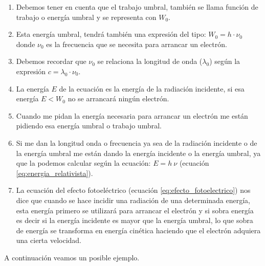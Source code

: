 \begin{consejo}
    \phantom{a}

    \begin{enumerate}
        \item Debemos tener en cuenta que el trabajo umbral, también se llama función de trabajo o energía umbral y se representa con \(W_0\).
        \item Esta energía umbral, tendrá también una expresión del tipo: \(W_0 = h\cdot \nu_0\) donde \(\nu_0\) es la frecuencia que se necesita para arrancar un electrón.
        \item Debemos recordar que \(\nu_0\) se relaciona la longitud de onda (\(\lambda_0\)) según la expresión \(c = \lambda_0 \cdot \nu_0\).
        \item La energía \(E\) de la ecuación es la energía de la radiación incidente, si esa energía \(E < W_0 \) no se arrancará ningún electrón.
        \item Cuando me pidan la energía necesaria para arrancar un electrón me están pidiendo esa energía umbral o trabajo umbral.
        \item Si me dan la longitud onda o frecuencia ya sea de la radiación incidente o de la energía umbral me están dando la energía incidente o la energía umbral, ya que la podemos calcular según la ecuación: \( E = h\ \nu \) (ecuación \eqref{eq:energia_relativista}).
        \item La ecuación del efecto fotoeléctrico (ecuación \eqref{eq:efecto_fotoelectrico}) nos dice que cuando se hace incidir una radiación de una determinada energía, esta energía primero se utilizará para arrancar el electrón y si sobra energía es decir si la energía incidente es mayor que la energía umbral, lo que sobra de energía se transforma en energía cinética haciendo que el electrón adquiera una cierta velocidad.
    \end{enumerate}
\end{consejo}

A continuación veamos un posible ejemplo.

